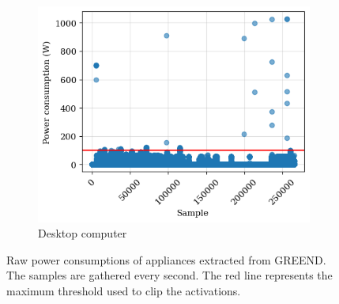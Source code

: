 \begin{figure}\ContinuedFloat
    \begin{subfigure}{\textwidth}
      \centering
      \includegraphics[width=.45\linewidth]{images/raw_consumptions/desktop_computer.png}
      \caption{Desktop computer}
      \label{fig:desktop_computer}
    \end{subfigure}
\caption[Raw power consumptions of appliances extracted from GREEND]{Raw power consumptions of appliances extracted from GREEND. The samples are gathered every second. The red line represents the maximum threshold used to clip the activations.}
\label{fig:raw_power_consumptions_greend}
\end{figure}

